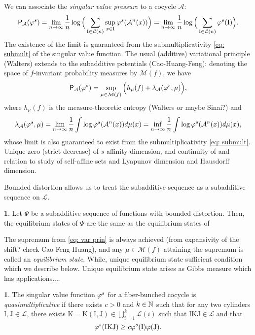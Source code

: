 \documentclass[11pt,oneside,reqno]{amsart}
\numberwithin{equation}{section}
\numberwithin{figure}{section}
\theoremstyle{definition}
\theoremstyle{definition}
\theoremstyle{definition}
\newtheorem{defn}[thm]{\protect\definitionname}
\theoremstyle{definition}
\newtheorem{lem}[thm]{\protect\lemmaname}
\theoremstyle{remark}
\theoremstyle{definition}
\theoremstyle{definition}
\theoremstyle{definition}
\def\A{\mathcal{A}}
\def\L{\mathcal{L}}
\def\P{\mathsf{P}}
\def\I{\mathrm{I}}
\def\J{\mathrm{J}}
\def\K{\mathrm{K}}
\def\M{\mathcal{M}}
\def\vps{\vphi^s}
\def\fb{fiber-bunched }
\providecommand{\definitionname}{Definition}
\providecommand{\lemmaname}{Lemma}
\begin{document}
We can associate the \textit{singular value pressure} to a cocycle $\A$:
\begin{equation}\label{eq: sing pressure}
\P_\A(\vps) = \lim\limits_{n \to \infty} \frac{1}{n}\log\Big( \sum\limits_{\I \in \L(n)} \sup\limits_{x \in \I} \vps(\A^n(x))\Big)=\lim\limits_{n \to \infty} \frac{1}{n}\log\Big( \sum\limits_{\I \in \L(n)}  \vps(\I)\Big).
\end{equation}
The existence of the limit is guaranteed from the submultiplicativity \eqref{eq: submult} of the singular value function. The usual (additive) variational principle (Walters) extends to the subadditive potentials (Cao-Huang-Feng): denoting the space of $f$-invariant probability measures by $\M(f)$, we have
\begin{equation}\label{eq: var prin}
\P_\A(\vps) = \sup\limits_{\mu \in \M(f)} \Big( h_\mu(f)+\lambda_\A(\vps,\mu)\Big),
\end{equation}
where $h_\mu(f)$ is the measure-theoretic entropy (Walters or maybe Sinai?) and $$\lambda_\A(\vps,\mu) = \lim\limits_{n \to \infty} \frac{1}{n} \int \log \vps(\A^n(x)) d\mu(x) = \inf\limits_{n  \to \infty}\frac{1}{n} \int \log \vps(\A^n(x)) d\mu(x),$$
whose limit is also guaranteed to exist from the submultiplicativity \eqref{eq: submult}. Unique zero (strict decrease) of $s$ affinity dimension, and continuity of and relation to study of self-affine sets and Lyapunov dimension and Hausdorff dimension.

Bounded distortion allows us to treat the subadditive sequence as a subadditive sequence on $\L$.
\begin{lem}
Let $\Psi$ be a subadditive sequence of functions with bounded distortion. Then, the equilibrium states of $\Psi$ are the same as the equilibrium states of
\end{lem}

The supremum from \eqref{eq: var prin} is always achieved (from expansivity of the shift? check Cao-Feng-Huang), and any $\mu \in \M(f)$ attaining the supremum is called an \textit{equilibrium state}. While,  unique equilibrium state sufficient condition which we describe below. Unique equilibrium state arises as Gibbs measure which has applications....


\begin{defn} The singular value function $\vps$ for a \fb cocycle is \textit{quasimultiplicative} if there exists $c>0$ and $k \in \mathbb{N}$ such that for any two cylinders $\I,\J \in\L$, there exists $\K = \K(\I,\J)\in \bigcup\limits_{i=1}^k\L(i)$ such that $\I\K\J \in \L$ and that
$$\vphi^s(\I\K\J) \geq c \vphi^s(\I)\vphi(\J).$$ 
\end{defn}
 
\end{document}
